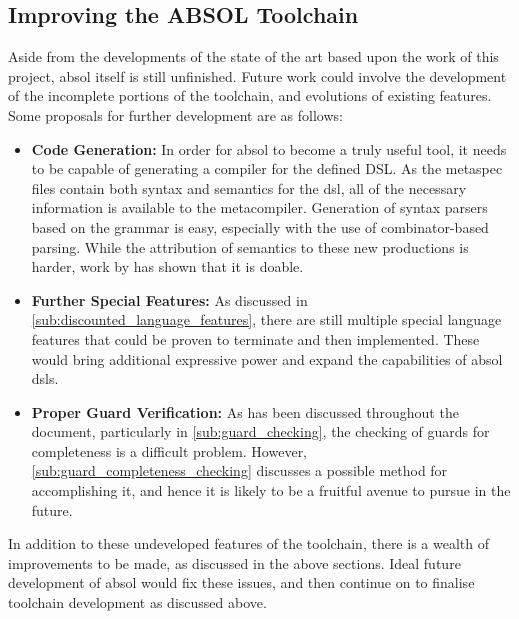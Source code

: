 \subsection{Improving the ABSOL Toolchain} %
\label{sub:improving_the_absol_toolchain}
Aside from the developments of the state of the art based upon the work of this project, \gls{absol} itself is still unfinished.
Future work could involve the development of the incomplete portions of the toolchain, and evolutions of existing features.
Some proposals for further development are as follows:
\begin{itemize}
    \item \textbf{Code Generation:} In order for \gls{absol} to become a truly useful tool, it needs to be capable of generating a compiler for the defined DSL.
    As the \gls{metaspec} files contain both syntax and semantics for the 
    \gls{dsl}, all of the necessary information is available to the metacompiler.
    Generation of syntax parsers based on the grammar is easy, especially with the use of combinator-based parsing.
    While the attribution of semantics to these new productions is harder, work by \citet{diehl1996semantics} has shown that it is doable.
    \item \textbf{Further Special Features:} As discussed in \autoref{sub:discounted_language_features}, there are still multiple special language features that could be proven to terminate and then implemented.
    These would bring additional expressive power and expand the capabilities of \gls{absol} \glspl{dsl}.
    \item \textbf{Proper Guard Verification:} As has been discussed throughout the document, particularly in \autoref{sub:guard_checking}, the checking of guards for completeness is a difficult problem.
    However, \autoref{sub:guard_completeness_checking} discusses a possible method for accomplishing it, and hence it is likely to be a fruitful avenue to pursue in the future. 
\end{itemize}

In addition to these undeveloped features of the toolchain, there is a wealth of improvements to be made, as discussed in the above sections.
Ideal future development of \gls{absol} would fix these issues, and then continue on to finalise toolchain development as discussed above.



